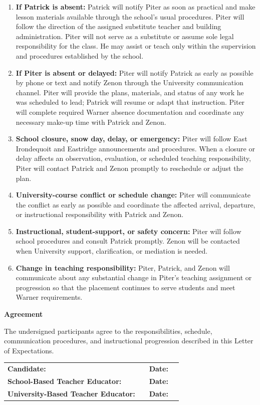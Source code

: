 \documentclass[10pt]{article}
\begin{document}
\begin{enumerate}
  \item \textbf{If Patrick is absent:} Patrick will notify Piter as soon as practical and make lesson materials available through the school's usual procedures. Piter will follow the direction of the assigned substitute teacher and building administration. Piter will not serve as a substitute or assume sole legal responsibility for the class. He may assist or teach only within the supervision and procedures established by the school.
  \item \textbf{If Piter is absent or delayed:} Piter will notify Patrick as early as possible by phone or text and notify Zenon through the University communication channel. Piter will provide the plans, materials, and status of any work he was scheduled to lead; Patrick will resume or adapt that instruction. Piter will complete required Warner absence documentation and coordinate any necessary make-up time with Patrick and Zenon.
  \item \textbf{School closure, snow day, delay, or emergency:} Piter will follow East Irondequoit and Eastridge announcements and procedures. When a closure or delay affects an observation, evaluation, or scheduled teaching responsibility, Piter will contact Patrick and Zenon promptly to reschedule or adjust the plan.
  \item \textbf{University-course conflict or schedule change:} Piter will communicate the conflict as early as possible and coordinate the affected arrival, departure, or instructional responsibility with Patrick and Zenon.
  \item \textbf{Instructional, student-support, or safety concern:} Piter will follow school procedures and consult Patrick promptly. Zenon will be contacted when University support, clarification, or mediation is needed.
  \item \textbf{Change in teaching responsibility:} Piter, Patrick, and Zenon will communicate about any substantial change in Piter's teaching assignment or progression so that the placement continues to serve students and meet Warner requirements.
\end{enumerate}

\vspace{7pt}
\textbf{Agreement}

The undersigned participants agree to the responsibilities, schedule, communication procedures, and instructional progression described in this Letter of Expectations.

\vspace{12pt}
\small
\begin{tabularx}{\textwidth}{@{}>{\RaggedRight\arraybackslash}p{}X p{}p{}@{}}
\textbf{Candidate:} & \hrulefill & \textbf{Date:} & \hrulefill \\[12pt]
\textbf{School-Based Teacher Educator:} & \hrulefill & \textbf{Date:} & \hrulefill \\[12pt]
\textbf{University-Based Teacher Educator:} & \hrulefill & \textbf{Date:} & \hrulefill \\
\end{tabularx}
\end{document}

